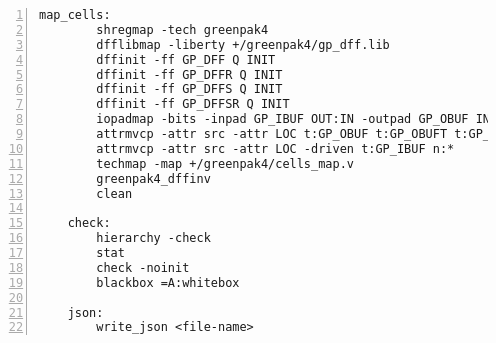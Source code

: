 \begin{lstlisting}[numbers=left,frame=single]
    map_cells:
        shregmap -tech greenpak4
        dfflibmap -liberty +/greenpak4/gp_dff.lib
        dffinit -ff GP_DFF Q INIT
        dffinit -ff GP_DFFR Q INIT
        dffinit -ff GP_DFFS Q INIT
        dffinit -ff GP_DFFSR Q INIT
        iopadmap -bits -inpad GP_IBUF OUT:IN -outpad GP_OBUF IN:OUT -inoutpad GP_OBUF OUT:IN -toutpad GP_OBUFT OE:IN:OUT -tinoutpad GP_IOBUF OE:OUT:IN:IO
        attrmvcp -attr src -attr LOC t:GP_OBUF t:GP_OBUFT t:GP_IOBUF n:*
        attrmvcp -attr src -attr LOC -driven t:GP_IBUF n:*
        techmap -map +/greenpak4/cells_map.v
        greenpak4_dffinv
        clean

    check:
        hierarchy -check
        stat
        check -noinit
        blackbox =A:whitebox

    json:
        write_json <file-name>
\end{lstlisting}

